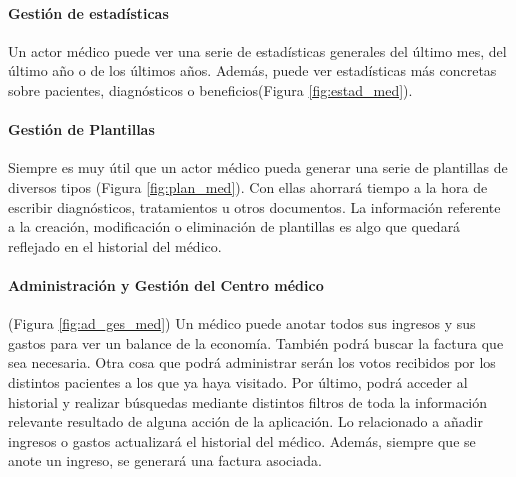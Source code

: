 				\paragraph{Gestión de estadísticas} %
				\label{par:gestion_de_estadisticas}
					Un actor médico puede ver una serie de estadísticas generales del último mes, del último año o de los últimos años. Además, puede ver estadísticas más concretas sobre pacientes, diagnósticos o beneficios(Figura \ref{fig:estad_med}). 


				\paragraph{Gestión de Plantillas} %
				\label{par:gestion_de_plantillas}
					Siempre es muy útil que un actor médico pueda generar una serie de plantillas de diversos tipos (Figura \ref{fig:plan_med}). Con ellas ahorrará tiempo a la hora de escribir diagnósticos, tratamientos u otros documentos. La información referente a la creación, modificación o eliminación de plantillas es algo que quedará reflejado en el historial del médico.


				\paragraph{Administración y Gestión del Centro médico} %
				\label{par:administracion_y_gestion_del_centro_medico}

					(Figura \ref{fig:ad_ges_med}) Un médico puede anotar todos sus ingresos y sus gastos para ver un balance de la economía. También podrá buscar la factura que sea necesaria. Otra cosa que podrá administrar serán los votos recibidos por los distintos pacientes a los que ya haya visitado. Por último, podrá acceder al historial y realizar búsquedas mediante distintos filtros de toda la información relevante resultado de alguna acción de la aplicación. Lo relacionado a añadir ingresos o gastos actualizará el historial del médico. Además, siempre que se anote un ingreso, se generará una factura asociada.

